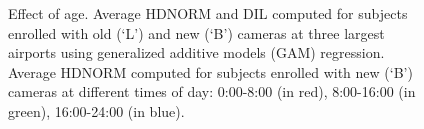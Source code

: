 \documentclass{cta-author}%
\begin{document}
\begin{figure} [!t]
	
\caption{
Effect of age. 
 { Average HDNORM and DIL computed 
for subjects enrolled with old (`L') and new (`B') cameras at three largest airports
using generalized additive models (GAM) regression. 
}
 {  Average HDNORM  computed for subjects enrolled with new (`B') cameras at different times of day: 0:00-8:00 (in red), 8:00-16:00 (in green), 16:00-24:00 (in blue). 
}
\label{fAGEvsTime}}
\end{figure}
\end{document}
